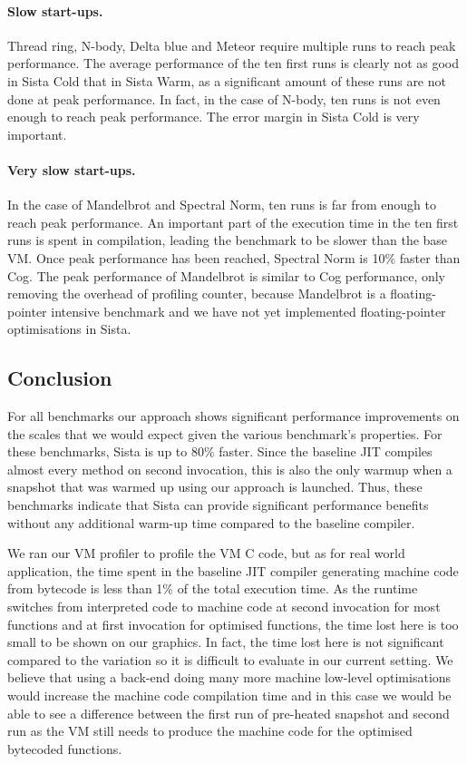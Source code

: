 \documentclass[a4paper,12pt,twoside]{../includes/ThesisStyle}
\begin{document}
	\paragraph{Slow start-ups.} Thread ring, N-body, Delta blue and Meteor require multiple runs to reach peak performance. The average performance of the ten first runs is clearly not as good in Sista Cold that in Sista Warm, as a significant amount of these runs are not done at peak performance. In fact, in the case of N-body, ten runs is not even enough to reach peak performance. The error margin in Sista Cold is very important.

	\paragraph{Very slow start-ups.} In the case of Mandelbrot and Spectral Norm, ten runs is far from enough to reach peak performance. An important part of the execution time in the ten first runs is spent in compilation, leading the benchmark to be slower than the base VM. Once peak performance has been reached, Spectral Norm is 10\% faster than Cog. The peak performance of Mandelbrot is similar to Cog performance, only removing the overhead of profiling counter, because Mandelbrot is a floating-pointer intensive benchmark and we have not yet implemented floating-pointer optimisations in Sista.

\subsection{Conclusion}

For all benchmarks our approach shows significant performance improvements on the scales that we would expect given the various benchmark's properties. For these benchmarks, Sista is up to 80\% faster. Since the baseline JIT compiles almost every method on second invocation, this is also the only warmup when a snapshot that was warmed up using our approach is launched. Thus, these benchmarks indicate that Sista can provide significant performance benefits without any additional warm-up time compared to the baseline compiler.

	We ran our VM profiler to profile the VM C code, but as for real world application, the time spent in the baseline JIT compiler generating machine code from bytecode is less than 1\% of the total execution time. As the runtime switches from interpreted code to machine code at second invocation for most functions and at first invocation for optimised functions, the time lost here is too small to be shown on our graphics. In fact, the time lost here is not significant compared to the variation so it is difficult to evaluate in our current setting. We believe that using a back-end doing many more machine low-level optimisations would increase the machine code compilation time and in this case we would be able to see a difference between the first run of pre-heated snapshot and second run as the VM still needs to produce the machine code for the optimised bytecoded functions.
\end{document}
